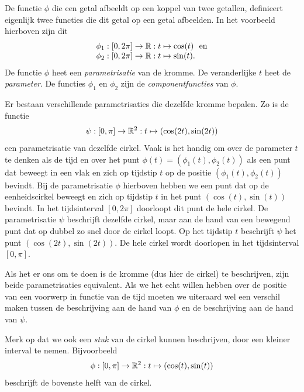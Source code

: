 
De functie $\phi$ die een getal afbeeldt op een koppel van twee
getallen, definieert eigenlijk twee functies die dit getal op een
getal afbeelden. In het voorbeeld hierboven zijn dit
\[
\ba{l}
\phi_1: [0,2\pi] \rightarrow \R : t \mapsto \cos(t) ~\mbox{ en}\\
\phi_2: [0,2\pi] \rightarrow \R : t \mapsto \sin(t).
\ea
\]
De functie $\phi$ heet een {\em parametrisatie} van de kromme. De
veranderlijke $t$ heet de {\em parameter}. De functies $\phi_1$ en
$\phi_2$ zijn de {\em componentfuncties} van $\phi$.

Er bestaan verschillende parametrisaties die dezelfde kromme bepalen.
Zo is de functie
\[
\psi: [0,\pi] \rightarrow \R^2: t \mapsto (\cos(2t),\sin(2t))
\]
een parametrisatie van dezelfde cirkel.
Vaak is het handig om over de parameter $t$ te denken als de tijd en
over het punt $\phi(t)=(\phi_1(t),\phi_2(t))$ als een punt dat beweegt
in een vlak en zich op tijdstip $t$ op de positie
$(\phi_1(t),\phi_2(t))$ bevindt. Bij de parametrisatie $\phi$ hierboven
hebben we een punt dat op de eenheidscirkel beweegt en zich op
tijdstip $t$ in het punt $(\cos(t),\sin(t))$ bevindt. In het
tijdsinterval $[0,2\pi]$ doorloopt dit punt de hele cirkel. De
parametrisatie $\psi$ beschrijft dezelfde cirkel, maar aan de hand van
een bewegend punt dat op dubbel zo snel door de cirkel loopt. Op het
tijdstip $t$ beschrijft $\psi$ het punt $(\cos(2t),\sin(2t))$. De hele
cirkel wordt doorlopen in het tijdsinterval $[0,\pi]$.

Als het er ons om te doen is de kromme (dus hier de cirkel) te
beschrijven, zijn beide parametrisaties equivalent. Als we het echt
willen hebben over de positie van een voorwerp in functie van de tijd
moeten we uiteraard wel een verschil maken tussen de beschrijving aan
de hand van $\phi$ en de beschrijving aan de hand van $\psi$.


Merk op dat we ook een {\em stuk} van de cirkel kunnen beschrijven, door een
kleiner interval te nemen.
Bijvoorbeeld
\[
\phi:[0,\pi]\rightarrow \R^2: t \mapsto (\cos(t),\sin(t))
\]
beschrijft de bovenste helft van de cirkel.

